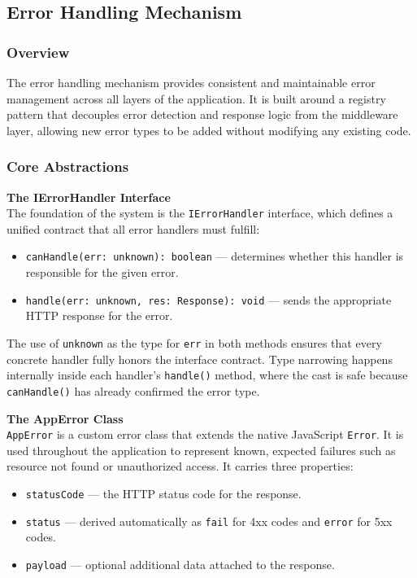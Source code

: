 \subsection{Error Handling Mechanism}
\label{subsec:error-handling}

\subsubsection{Overview}
The error handling mechanism provides consistent and maintainable error management across all layers of the application. It is built around a registry pattern that decouples error detection and response logic from 
the middleware layer, allowing new error types to be added without modifying any existing code.

\subsubsection{Core Abstractions}

\textbf{The IErrorHandler Interface}\\
The foundation of the system is the \texttt{IErrorHandler} interface, which defines a unified contract that all error handlers must fulfill:

\begin{itemize}
    \item \texttt{canHandle(err: unknown): boolean} — determines whether this handler is responsible for the given error.
    \item \texttt{handle(err: unknown, res: Response): void} — sends the appropriate HTTP response for the error.
\end{itemize}

The use of \texttt{unknown} as the type for \texttt{err} in both methods ensures that every concrete handler fully honors the interface contract. Type narrowing happens internally inside each handler's \texttt{handle()} method, where the cast is safe because \texttt{canHandle()} has already confirmed the error type.

\textbf{The AppError Class}\\
\texttt{AppError} is a custom error class that extends the native JavaScript \texttt{Error}. It is used throughout the application to represent known, expected failures such as resource not found or unauthorized access. It carries three properties:

\begin{itemize}
    \item \texttt{statusCode} — the HTTP status code for the response.
    \item \texttt{status} — derived automatically as \texttt{fail} for 4xx codes and \texttt{error} for 5xx codes.
    \item \texttt{payload} — optional additional data attached to the response.
\end{itemize}


